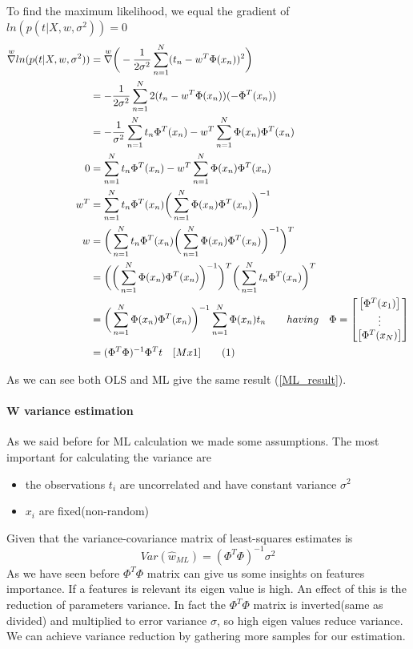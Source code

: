 \documentclass[main.tex]{subfiles}
\newcommand\numberthis{\addtocounter{equation}{1}\tag{\theequation}}
\begin{document}
To find the maximum likelihood, we equal the gradient of $ln(p(t|X,w,\sigma^2))=0$
\begin{align*}
    \overset{w}{\nabla}ln(p(t|X,w,\sigma^2))&=\overset{w}{\nabla}\bigg( -\frac{1}{2\sigma^2} \sum_{n=1}^N(t_n-w^T\Phi(x_n))^2 \bigg) \\
    &=-\frac{1}{2\sigma^2} \sum_{n=1}^N2(t_n-w^T\Phi(x_n))(-\Phi^T(x_n)) \\
    &=-\frac{1}{\sigma^2} \sum_{n=1}^N t_n\Phi^T(x_n) - w^T \sum_{n=1}^N \Phi(x_n)\Phi^T(x_n) \\
    0 &= \sum_{n=1}^N t_n\Phi^T(x_n) - w^T \sum_{n=1}^N \Phi(x_n)\Phi^T(x_n) \\
    w^T &= \sum_{n=1}^N t_n\Phi^T(x_n) \bigg( \sum_{n=1}^N \Phi(x_n)\Phi^T(x_n) \bigg)^{-1} \\
    w &= \bigg( \sum_{n=1}^N t_n\Phi^T(x_n) \bigg( \sum_{n=1}^N \Phi(x_n)\Phi^T(x_n) \bigg)^{-1} \bigg)^T \\
    &= \bigg( \bigg( \sum_{n=1}^N \Phi(x_n)\Phi^T(x_n) \bigg)^{-1} \bigg)^T \bigg( \sum_{n=1}^N t_n\Phi^T(x_n) \bigg)^T \\
    &= \bigg( \sum_{n=1}^N \Phi(x_n)\Phi^T(x_n) \bigg)^{-1} \sum_{n=1}^N \Phi(x_n)t_n 
    \quad \quad having \quad \Phi=\begin{bmatrix} \begin{bmatrix} \Phi^T(x_1) \end{bmatrix} \\ \vdots \\ \begin{bmatrix} \Phi^T(x_N) \end{bmatrix} \end{bmatrix} \\
    &= (\Phi^T \Phi)^{-1} \Phi^T t \quad [Mx1]\numberthis{} \label{ML_result}
\end{align*}

\newpage
As we can see both OLS and ML give the same result (\ref{ML_result}).

\paragraph{W variance estimation} As we said before for ML calculation we made some assumptions. The most important for calculating the variance are
\begin{itemize}
    \item the observations $t_i$ are uncorrelated and have constant variance $\sigma^2$
    \item $x_i$ are fixed(non-random)
\end{itemize}
Given that the variance-covariance matrix of least-squares estimates is
\begin{equation}
    Var(\hat{w}_{ML})=(\Phi^T\Phi)^{-1}\sigma^2
\end{equation}
As we have seen before $\Phi^T\Phi$ matrix can give us some insights on features importance. If a features is relevant its eigen value is high. An effect of this is the reduction of parameters variance. In fact the $\Phi^T\Phi$ matrix is inverted(same as divided) and multiplied to error variance $\sigma$, so high eigen values reduce variance.
We can achieve variance reduction by gathering more samples for our estimation.
\end{document}
